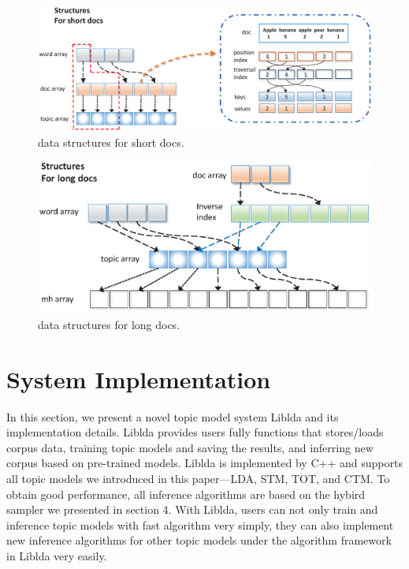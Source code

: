 \documentclass[10pt,journal,cspaper,compsoc]{IEEEtran}
\begin{document}
	\begin{figure}[t]
		\center
		\includegraphics[width=0.9\linewidth]{figures/short_docs.eps}
		\caption{data structures for short docs.}
		\label{fg:short_docs}
	\end{figure}
	\begin{figure}[t]
		\center
		\includegraphics[width=0.9\linewidth]{figures/long_docs.eps}
		\caption{data structures for long docs.}
		\label{fg:long_docs}
	\end{figure}
	
	\section{System Implementation}
	In this section, we present a novel topic model system
	Liblda and its implementation details. Liblda provides
	users fully functions that stores/loads corpus data,
	training topic models and saving the results, and inferring
	new corpus based on pre-trained models. Liblda is implemented
	by C++ and supports all topic models we introduced in this paper---LDA, STM, TOT, and CTM. To obtain good performance, 
	all inference algorithms are based on the hybird sampler we presented 
	in section 4. 
    With Liblda, users can not only train and inference topic models  with fast algorithm very simply, they can 
    also implement new inference algorithms for other topic models under the algorithm framework in Liblda very easily.
    
\end{document}
